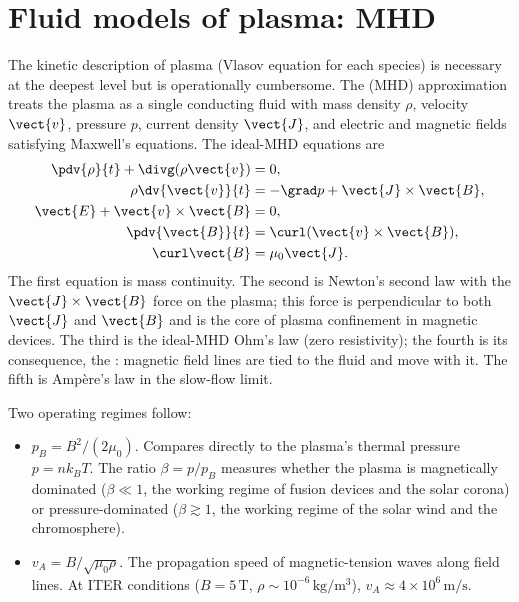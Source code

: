 \section{Fluid models of plasma: MHD}

The kinetic description of plasma (Vlasov equation for each species)
is necessary at the deepest level but is operationally cumbersome.
The  (MHD) approximation treats the
plasma as a single conducting fluid with mass density $\rho$,
velocity $\vect{v}$, pressure $p$, current density $\vect{J}$, and
electric and magnetic fields satisfying Maxwell's equations. The
ideal-MHD equations are
\begin{align}
\pdv{\rho}{t} + \divg(\rho\vect{v}) &= 0,\\
\rho\dv{\vect{v}}{t} &= -\grad p + \vect{J}\times \vect{B},\\
\vect{E} + \vect{v}\times \vect{B} &= 0,\\
\pdv{\vect{B}}{t} &= \curl(\vect{v}\times \vect{B}),\\
\curl \vect{B} &= \mu_{0}\vect{J}.
\end{align}
The first equation is mass continuity. The second is Newton's second
law with the $\vect{J}\times \vect{B}$ force on the plasma; this
force is perpendicular to both $\vect{J}$ and $\vect{B}$ and is the
core of plasma confinement in magnetic devices. The third is the
ideal-MHD Ohm's law (zero resistivity); the fourth is its consequence,
the : magnetic field lines are tied
to the fluid and move with it. The fifth is Amp\`ere's law in the
slow-flow limit.

Two operating regimes follow:
\begin{itemize}[leftmargin=*]
  \item {} $p_{B} = B^{2}/(2\mu_{0})$.
    Compares directly to the plasma's thermal pressure
    $p = nk_{B}T$. The ratio $\beta = p/p_{B}$ measures whether the
    plasma is magnetically dominated ($\beta\ll 1$, the working
    regime of fusion devices and the solar corona) or
    pressure-dominated ($\beta\gtrsim 1$, the working regime of the
    solar wind and the chromosphere).
  \item {} $v_{A} = B/\sqrt{\mu_{0}\rho}$. The
    propagation speed of magnetic-tension waves along field lines.
    At ITER conditions ($B = 5\,\si{\tesla}$, $\rho \sim 10^{-6}\,\si{
    \kilogram\per\meter\cubed}$), $v_{A}\approx 4\times 10^{6}\,\si{
    \meter\per\second}$.
\end{itemize}

